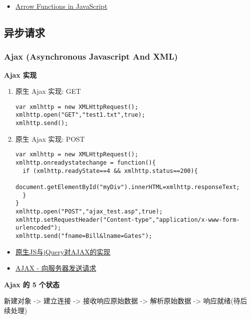 \begin{itemize}
\tightlist
\item
  \href{https://tylermcginnis.com/arrow-functions/}{Arrow Functions in
  JavaScript}
\end{itemize}

\subsection{异步请求}\label{ux5f02ux6b65ux8bf7ux6c42}

\subsubsection{Ajax (Asynchronous Javascript And
XML)}\label{ajax-asynchronous-javascript-and-xml}

\textbf{Ajax 实现}

\begin{enumerate}
\def\labelenumi{\arabic{enumi}.}
\item
  原生 Ajax 实现: GET

\begin{lstlisting}
var xmlhttp = new XMLHttpRequest();
xmlhttp.open("GET","test1.txt",true);
xmlhttp.send();
\end{lstlisting}
\item
  原生 Ajax 实现: POST

\begin{lstlisting}
var xmlhttp = new XMLHttpRequest();
xmlhttp.onreadystatechange = function(){
  if (xmlhttp.readyState==4 && xmlhttp.status==200){
    document.getElementById("myDiv").innerHTML=xmlhttp.responseText;
  }
}
xmlhttp.open("POST","ajax_test.asp",true);
xmlhttp.setRequestHeader("Content-type","application/x-www-form-urlencoded");
xmlhttp.send("fname=Bill&lname=Gates");
\end{lstlisting}
\end{enumerate}

\begin{itemize}
\tightlist
\item
  \href{http://segmentfault.com/a/1190000003096293}{原生JS与jQuery对AJAX的实现}
\item
  \href{http://www.w3school.com.cn/ajax/ajax_xmlhttprequest_send.asp}{AJAX
  - 向服务器发送请求}
\end{itemize}

\textbf{Ajax 的 5 个状态}

新建对象 -\textgreater{} 建立连接 -\textgreater{} 接收响应原始数据
-\textgreater{} 解析原始数据 -\textgreater{} 响应就绪(待后续处理)

